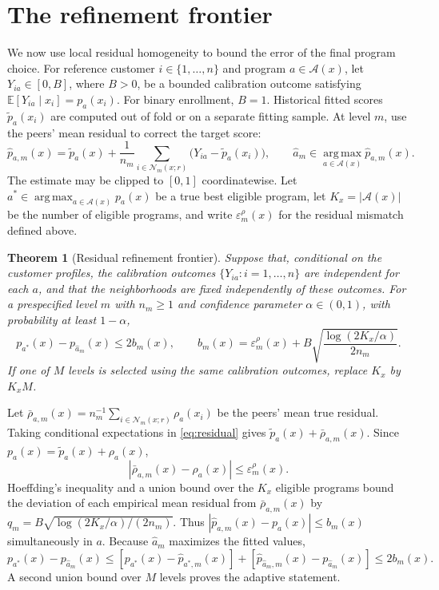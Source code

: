 \documentclass[11pt]{article}
\makeatletter
\theoremstyle{noteplain}
\newtheorem{theorem}{Theorem}
\theoremstyle{definition}
\renewenvironment{proof}[1][\proofname]{\par
  \pushQED{\qed}%
  \normalfont \topsep5\p@\@plus5\p@\relax
  \trivlist
  \item[\hskip\labelsep\bfseries #1\@addpunct{.}]\ignorespaces
}{%
  \popQED\endtrivlist\@endpefalse
}
\newcommand{\E}{\mathbb E}
\newcommand{\cA}{\mathcal A}
\newcommand{\cN}{\mathcal N}
\newcommand{\argmax}{\operatorname*{arg\,max}}
\makeatother
\begin{document}
\section{The refinement frontier}

We now use local residual homogeneity to bound the error of the final program choice. For reference customer $i\in\{1,\ldots,n\}$ and program $a\in\cA(x)$, let $Y_{ia}\in[0,B]$, where $B>0$, be a bounded calibration outcome satisfying $\E[Y_{ia}\mid x_i]=p_a(x_i)$. For binary enrollment, $B=1$. Historical fitted scores $\widetilde p_a(x_i)$ are computed out of fold or on a separate fitting sample. At level $m$, use the peers' mean residual to correct the target score:
\begin{equation}\label{eq:residual}
 \widehat p_{a,m}(x)=\widetilde p_a(x)
 +\frac{1}{n_m}\sum_{i\in\cN_m(x;r)}
 \bigl(Y_{ia}-\widetilde p_a(x_i)\bigr),
 \qquad
 \widehat a_m\in\argmax_{a\in\cA(x)}\widehat p_{a,m}(x).
\end{equation}
The estimate may be clipped to $[0,1]$ coordinatewise. Let $a^*\in\argmax_{a\in\cA(x)}p_a(x)$ be a true best eligible program, let $K_x=|\cA(x)|$ be the number of eligible programs, and write $\varepsilon_m^\rho(x)$ for the residual mismatch defined above.

\begin{theorem}[Residual refinement frontier]\label{thm:frontier}
Suppose that, conditional on the customer profiles, the calibration outcomes $\{Y_{ia}:i=1,\ldots,n\}$ are independent for each $a$, and that the neighborhoods are fixed independently of these outcomes. For a prespecified level $m$ with $n_m\geq1$ and confidence parameter $\alpha\in(0,1)$, with probability at least $1-\alpha$,
\[
 p_{a^*}(x)-p_{\widehat a_m}(x)
 \leq 2b_m(x),\qquad
 b_m(x)=\varepsilon_m^\rho(x)
 +B\sqrt{\frac{\log(2K_x/\alpha)}{2n_m}}.
\]
If one of $M$ levels is selected using the same calibration outcomes, replace $K_x$ by $K_xM$.
\end{theorem}

\begin{proof}
Let $\bar\rho_{a,m}(x)=n_m^{-1}\sum_{i\in\cN_m(x;r)}\rho_a(x_i)$ be the peers' mean true residual. Taking conditional expectations in \eqref{eq:residual} gives $\widetilde p_a(x)+\bar\rho_{a,m}(x)$. Since $p_a(x)=\widetilde p_a(x)+\rho_a(x)$,
\[
 |\bar\rho_{a,m}(x)-\rho_a(x)|\leq\varepsilon_m^\rho(x).
\]
Hoeffding's inequality \cite{hoeffding} and a union bound over the $K_x$ eligible programs bound the deviation of each empirical mean residual from $\bar\rho_{a,m}(x)$ by
$q_m=B\sqrt{\log(2K_x/\alpha)/(2n_m)}$. Thus
$|\widehat p_{a,m}(x)-p_a(x)|\leq b_m(x)$ simultaneously in $a$. Because $\widehat a_m$ maximizes the fitted values,
\[
 p_{a^*}(x)-p_{\widehat a_m}(x)
 \leq[p_{a^*}(x)-\widehat p_{a^*,m}(x)]
 +[\widehat p_{\widehat a_m,m}(x)-p_{\widehat a_m}(x)]
 \leq2b_m(x).
\]
A second union bound over $M$ levels proves the adaptive statement.
\end{proof}
\end{document}
